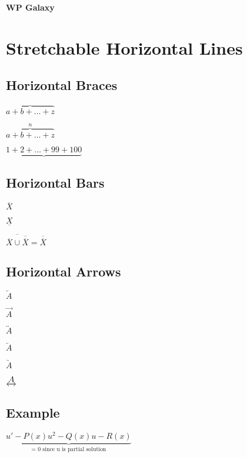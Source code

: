 \documentclass{article}
\begin{document}
	
	\begin{center}
		{\huge \textbf{WP Galaxy}}
	\end{center}
	
	\section{Stretchable Horizontal Lines}
	
	\subsection{Horizontal Braces}
	\par $\overbrace{a + b + \dots + z}$
	\\
	
	
	\par $\overbrace{a + b + \dots + z}^n$
	\\
	
	\par $\underbrace{1 + 2 + \dots + 99 + 100}$\\
	
	\subsection{Horizontal Bars}
	\par $\overline{X}$    \\
	
	
	\par $\underline{X}$    \\
	
	\par 
	
	$\overline{\overline{X} \cup \overline{\overline{X}}} = \overline{\overline{X}}$     \\
	
	
	\subsection{Horizontal Arrows}
	
	\par $\overleftarrow{A}$   			\\
	\par $\overrightarrow{A}$  			\\
	\par $\overleftrightarrow{A}$  		\\
	\par $\underleftarrow{A}$  			\\
	\par $\underrightarrow{A}$  		\\
	\par $\underleftrightarrow{A}$  	\\
	
	\subsection{Example}
	\par 
	
	$\underbrace{u' - P(x)u^2 - Q(x)u - R(x)}_{\text{= 0 since u is partial solution}}$
	
	
	
	
	
\end{document}
